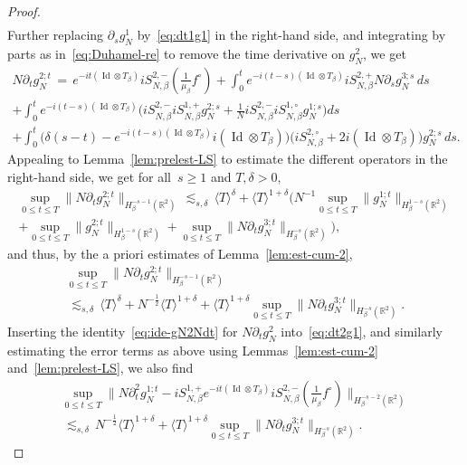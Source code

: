 \documentclass[a4paper,11pt,reqno,noindent]{amsart}
\theoremstyle{plain}
\numberwithin{equation}{section}
\newcommand{\R}{\mathbb R}
\newcommand{\Id}{\operatorname{Id}}
\newcommand{\3}{|\!|\!|}
\begin{document}
\begin{proof}
\begin{multline*}
\end{multline*}
Further replacing $\partial_sg_N^1$ by~\eqref{eq:dt1g1} in the right-hand side, and integrating by parts as in~\eqref{eq:Duhamel-re} to remove the time derivative on $g_N^2$, we get
\begin{multline}\label{eq:ide-gN2Ndt}
N\partial_tg_N^{2;t}\,=\,e^{-it(\Id\otimes T_\beta)}iS_{N,\beta}^{2,-}(\tfrac1{\mu_\beta}f^\circ)
+\int_0^te^{-i(t-s)(\Id\otimes T_\beta)}iS_{N,\beta}^{2,+}N\partial_sg_N^{3;s}\,ds\\
+\int_0^te^{-i(t-s)(\Id\otimes T_\beta)}\Big(iS_{N,\beta}^{2,-}iS_{N,\beta}^{1,+}g_N^{2;s}+\tfrac1NiS_{N,\beta}^{2,-}iS_{N,\beta}^{1,\circ}g_N^{1;s}\Big)ds\\
+\int_0^t\Big(\delta(s-t)- e^{-i(t-s)(\Id\otimes T_\beta)}i(\Id\otimes T_\beta)\Big)\big(iS_{N,\beta}^{2,\circ}+2i(\Id\otimes T_\beta)\big)g_N^{2;s}\,ds.
\end{multline}
{Appealing to Lemma~\ref{lem:prelest-LS} to estimate the different operators in the right-hand side, we get for all~$s\ge1$ and $T,\delta>0$,
\begin{multline*}
\sup_{0\le t\le T}\|N\partial_tg_N^{2;t}\|_{H_\beta^{-s-1}(\R^2)}\,\lesssim_{s,\delta}\,\langle T\rangle^\delta
+\langle T\rangle^{1+\delta}\Big(N^{-1}\sup_{0\le t\le T}\|g_N^{1;t}\|_{H_\beta^{1-s}(\R^2)}\\
+\sup_{0\le t\le T}\|g_N^{2;t}\|_{H_\beta^{1-s}(\R^2)}
+\sup_{0\le t\le T}\|N\partial_tg_N^{3;t}\|_{H_\beta^{-s}(\R^2)}\Big),
\end{multline*}
and thus, by the a priori estimates of Lemma~\ref{lem:est-cum-2},
\begin{multline}\label{eq:estim-dt2g1}
\sup_{0\le t\le T}\|N\partial_tg_N^{2;t}\|_{H_\beta^{-s-1}(\R^2)}\\[-3mm]
\,\lesssim_{s,\delta}\,\langle T\rangle^\delta
+N^{-\frac12}\langle T\rangle^{1+\delta}
+\langle T\rangle^{1+\delta}\sup_{0\le t\le T}\|N\partial_tg_N^{3;t}\|_{H_\beta^{-s}(\R^2)}.
\end{multline}
Inserting the identity~\eqref{eq:ide-gN2Ndt} for $N\partial_tg_N^2$ into~\eqref{eq:dt2g1}, and similarly estimating the error terms as above using Lemmas~\ref{lem:est-cum-2} and~\ref{lem:prelest-LS}, we also find}
\begin{multline}\label{eq:estim-dt2g1-main}
\sup_{0\le t\le T}\Big\|N\partial_t^2g_N^{1;t}-iS_{N,\beta}^{1,+}e^{-it(\Id\otimes T_\beta)}iS_{N,\beta}^{2,-}(\tfrac1{\mu_\beta}f^\circ)\Big\|_{H^{-s-2}_\beta(\R^2)}\\
\,\lesssim_{s,\delta}\,N^{-\frac12}\langle T\rangle^{1+\delta} +\langle T\rangle^{1+\delta}\sup_{0\le t\le T}\|N\partial_tg_N^{3;t}\|_{H^{-s}_\beta(\R^2)}.

\end{multline}
\end{proof}
\end{document}
